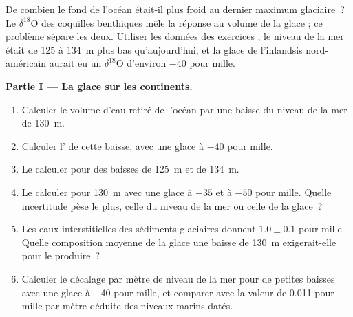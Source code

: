 \begin{problem}\label{pb:b2:climate-proxies:1}
De combien le fond de l'océan était-il plus froid au dernier maximum glaciaire~? Le $\delta^{18}$O des coquilles benthiques
mêle la réponse au volume de la glace ; ce problème sépare les deux. Utiliser les données des exercices ; le niveau de la mer
était de 125 à \qty{134}{m} plus bas qu'aujourd'hui, et la glace de l'inlandsis nord-américain aurait eu
un $\delta^{18}$O d'environ $-40$ pour mille.

\medskip\noindent\textbf{Partie I --- La glace sur les continents.}
\begin{enumerate}
  \item Calculer le volume d'eau retiré de l'océan par une baisse du niveau de la mer de \qty{130}{m}.
  \item Calculer l' de cette baisse, avec une glace à $-40$ pour mille.
  \item Le calculer pour des baisses de \qty{125}{m} et de \qty{134}{m}.
  \item Le calculer pour \qty{130}{m} avec une glace à $-35$ et à $-50$ pour mille. Quelle incertitude
        pèse le plus, celle du niveau de la mer ou celle de la glace~?
  \item Les eaux interstitielles des sédiments glaciaires donnent $1.0 \pm 0.1$ pour mille. Quelle composition moyenne
        de la glace une baisse de \qty{130}{m} exigerait-elle pour le produire~?
  \item Calculer le décalage par mètre de niveau de la mer pour de petites baisses avec une glace à $-40$ pour mille, et
        comparer avec la valeur de \num{0.011} pour mille par mètre déduite des niveaux marins datés.
\end{enumerate}


\end{problem}
